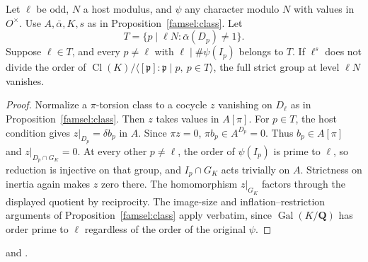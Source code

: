 \begin{proposition}
\label{famsel:hostinertia}
Let \(\ell\) be odd, \(N\) a host modulus, and \(\psi\) any character
modulo \(N\) with values in \(O^\times\). Use \(A,\bar\alpha,K,s\)
as in Proposition~\ref{famsel:class}. Let
\[
 T=\{p\mid\ell N:\bar\alpha(D_p)\ne1\}.
\]
Suppose \(\ell\in T\), and every \(p\ne\ell\) with
\(\ell\mid\#\psi(I_p)\) belongs to \(T\).
If \(\ell^s\) does not divide the order of
\(\operatorname{Cl}(K)/\langle[\mathfrak p]:\mathfrak p\mid p,\ p\in T\rangle\),
the full strict group at level \(\ell N\) vanishes.
\end{proposition}
\begin{proof}
Normalize a \(\pi\)-torsion class to a cocycle \(z\) vanishing on
\(D_\ell\) as in Proposition~\ref{famsel:class}. Then
\(z\) takes values in \(A[\pi]\). For \(p\in T\), the host condition
gives \(z|_{D_p}=\delta b_p\) in \(A\). Since \(\pi z=0\),
\(\pi b_p\in A^{D_p}=0\). Thus \(b_p\in A[\pi]\) and
\(z|_{D_p\cap G_K}=0\). At every other \(p\ne\ell\), the order of
\(\psi(I_p)\) is prime to \(\ell\), so reduction is injective on
that group, and \(I_p\cap G_K\) acts trivially on \(A\). Strictness
on inertia again makes \(z\) zero there. The homomorphism
\(z|_{G_K}\) factors through the displayed quotient by reciprocity.
The image-size and inflation--restriction arguments of
Proposition~\ref{famsel:class} apply verbatim, since
\(\operatorname{Gal}(K/\mathbf Q)\) has order prime to \(\ell\)
regardless of the order of the original \(\psi\).
\end{proof}

 and
.

